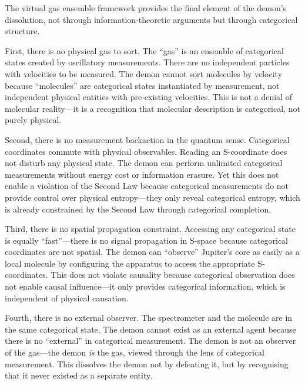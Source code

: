 \documentclass[12pt,a4paper]{article}
\theoremstyle{definition}
\theoremstyle{remark}
\begin{document}
The virtual gas ensemble framework provides the final element of the demon's dissolution, not through information-theoretic arguments but through categorical structure.

First, there is no physical gas to sort. The ``gas'' is an ensemble of categorical states created by oscillatory measurements. There are no independent particles with velocities to be measured. The demon cannot sort molecules by velocity because ``molecules'' are categorical states instantiated by measurement, not independent physical entities with pre-existing velocities. This is not a denial of molecular reality—it is a recognition that molecular description is categorical, not purely physical.

Second, there is no measurement backaction in the quantum sense. Categorical coordinates commute with physical observables. Reading an S-coordinate does not disturb any physical state. The demon can perform unlimited categorical measurements without energy cost or information erasure. Yet this does not enable a violation of the Second Law because categorical measurements do not provide control over physical entropy—they only reveal categorical entropy, which is already constrained by the Second Law through categorical completion.

Third, there is no spatial propagation constraint. Accessing any categorical state is equally ``fast''—there is no signal propagation in S-space because categorical coordinates are not spatial. The demon can ``observe'' Jupiter's core as easily as a local molecule by configuring the apparatus to access the appropriate S-coordinates. This does not violate causality because categorical observation does not enable causal influence—it only provides categorical information, which is independent of physical causation.

Fourth, there is no external observer. The spectrometer and the molecule are in the same categorical state. The demon cannot exist as an external agent because there is no ``external'' in categorical measurement. The demon is not an observer of the gas—the demon \textit{is} the gas, viewed through the lens of categorical measurement. This dissolves the demon not by defeating it, but by recognising that it never existed as a separate entity.
\end{document}
